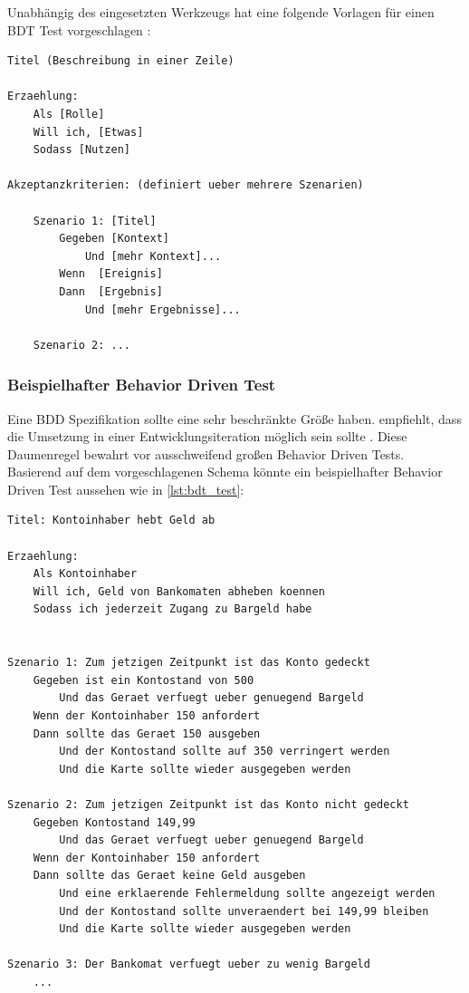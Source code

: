 Unabhängig des eingesetzten Werkzeugs hat \citeauthor{north_whats_2007} eine folgende Vorlagen für einen \Gls{BDT} Test vorgeschlagen \cite{north_whats_2007}:

\begin{lstlisting}[caption=Vorlage für Behavior Driven Tests in Prosatext, label=lst:bdt_template]
Titel (Beschreibung in einer Zeile)
 
Erzaehlung:
	Als [Rolle]
	Will ich, [Etwas]
	Sodass [Nutzen]
 
Akzeptanzkriterien: (definiert ueber mehrere Szenarien)
 
	Szenario 1: [Titel]
		Gegeben [Kontext]
	  		Und [mehr Kontext]...
		Wenn  [Ereignis]
		Dann  [Ergebnis]
	  		Und [mehr Ergebnisse]...
	 
	Szenario 2: ...
\end{lstlisting}

\subsubsection{Beispielhafter Behavior Driven Test}
\label{sec:bdt_bsp}
Eine \Gls{BDD} Spezifikation sollte eine sehr beschränkte Größe haben. \citeauthor{north_whats_2007} empfiehlt, dass die Umsetzung in einer Entwicklungsiteration möglich sein sollte \cite{north_whats_2007}. Diese Daumenregel bewahrt vor ausschweifend großen Behavior Driven Tests.\\
Basierend auf dem vorgeschlagenen Schema könnte ein beispielhafter Behavior Driven Test aussehen wie in \ref{lst:bdt_test}:

\begin{lstlisting}[caption=Beispielhafter Behavior Driven Test, label=lst:bdt_test]
Titel: Kontoinhaber hebt Geld ab
 
Erzaehlung:
	Als Kontoinhaber
	Will ich, Geld von Bankomaten abheben koennen
	Sodass ich jederzeit Zugang zu Bargeld habe
 
 
Szenario 1: Zum jetzigen Zeitpunkt ist das Konto gedeckt
	Gegeben ist ein Kontostand von 500
  		Und das Geraet verfuegt ueber genuegend Bargeld
	Wenn der Kontoinhaber 150 anfordert
	Dann sollte das Geraet 150 ausgeben
  		Und der Kontostand sollte auf 350 verringert werden
  		Und die Karte sollte wieder ausgegeben werden
 
Szenario 2: Zum jetzigen Zeitpunkt ist das Konto nicht gedeckt
	Gegeben Kontostand 149,99
  		Und das Geraet verfuegt ueber genuegend Bargeld
	Wenn der Kontoinhaber 150 anfordert
	Dann sollte das Geraet keine Geld ausgeben
		Und eine erklaerende Fehlermeldung sollte angezeigt werden
  		Und der Kontostand sollte unveraendert bei 149,99 bleiben
  		Und die Karte sollte wieder ausgegeben werden

Szenario 3: Der Bankomat verfuegt ueber zu wenig Bargeld
	...
\end{lstlisting}

